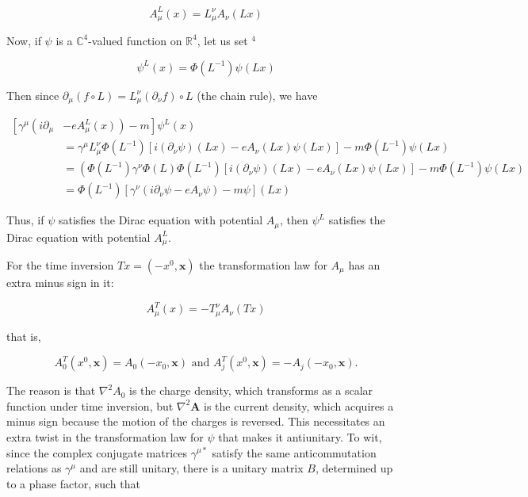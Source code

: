 \documentclass[10pt, letterpaper]{article}
\begin{document}
$$
A_{\mu}^{L}(x)=L_{\mu}^{\nu} A_{\nu}(L x)
$$

Now, if $\psi$ is a $\mathbb{C}^{4}$-valued function on $\mathbb{R}^{4}$, let us set ${ }^{4}$

$$
\psi^{L}(x)=\Phi\left(L^{-1}\right) \psi(L x)
$$

Then since $\partial_{\mu}(f \circ L)=L_{\mu}^{\nu}\left(\partial_{\nu} f\right) \circ L$ (the chain rule), we have

$$
\begin{aligned}
{\left[\gamma ^ { \mu } \left(i \partial_{\mu}\right.\right.} & \left.\left.-e A_{\mu}^{L}(x)\right)-m\right] \psi^{L}(x) \\
& =\gamma^{\mu} L_{\mu}^{\nu} \Phi\left(L^{-1}\right)\left[i\left(\partial_{\nu} \psi\right)(L x)-e A_{\nu}(L x) \psi(L x)\right]-m \Phi\left(L^{-1}\right) \psi(L x) \\
& =\left(\Phi\left(L^{-1}\right) \gamma^{\nu} \Phi(L) \Phi\left(L^{-1}\right)\left[i\left(\partial_{\nu} \psi\right)(L x)-e A_{\nu}(L x) \psi(L x)\right]-m \Phi\left(L^{-1}\right) \psi(L x)\right. \\
& =\Phi\left(L^{-1}\right)\left[\gamma^{\nu}\left(i \partial_{\nu} \psi-e A_{\nu} \psi\right)-m \psi\right](L x)
\end{aligned}
$$

Thus, if $\psi$ satisfies the Dirac equation with potential $A_{\mu}$, then $\psi^{L}$ satisfies the Dirac equation with potential $A_{\mu}^{L}$.

For the time inversion $T x=\left(-x^{0}, \mathbf{x}\right)$ the transformation law for $A_{\mu}$ has an extra minus sign in it:

$$
A_{\mu}^{T}(x)=-T_{\mu}^{\nu} A_{\nu}(T x)
$$

that is,

$$
A_{0}^{T}\left(x^{0}, \mathbf{x}\right)=A_{0}\left(-x_{0}, \mathbf{x}\right) \text { and } A_{j}^{T}\left(x^{0}, \mathbf{x}\right)=-A_{j}\left(-x_{0}, \mathbf{x}\right) .
$$

The reason is that $\nabla^{2} A_{0}$ is the charge density, which transforms as a scalar function under time inversion, but $\nabla^{2} \mathbf{A}$ is the current density, which acquires a minus sign because the motion of the charges is reversed. This necessitates an extra twist in the transformation law for $\psi$ that makes it antiunitary. To wit, since the complex conjugate matrices $\gamma^{\mu *}$ satisfy the same anticommutation relations as $\gamma^{\mu}$ and are still unitary, there is a unitary matrix $B$, determined up to a phase factor, such that
\end{document}
